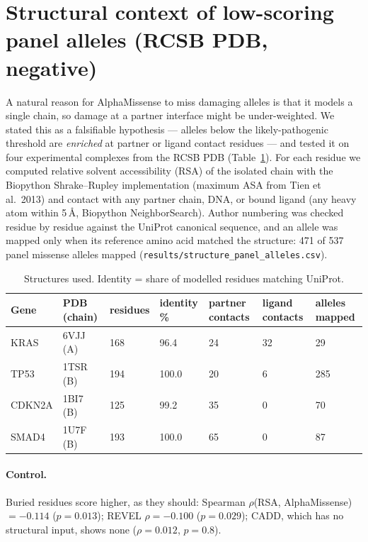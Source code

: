 \section{Structural context of low-scoring panel alleles (RCSB PDB, negative)}
A natural reason for AlphaMissense to miss damaging alleles is that it models
a single chain, so damage at a partner interface might be under-weighted. We
stated this as a falsifiable hypothesis --- alleles below the likely-pathogenic
threshold are \emph{enriched} at partner or ligand contact residues --- and
tested it on four experimental complexes from the RCSB PDB
(Table~\ref{tab:structure}). For each residue we computed relative solvent
accessibility (RSA) of the isolated chain with the Biopython Shrake--Rupley
implementation (maximum ASA from Tien et al.\ 2013) and contact with any
partner chain, DNA, or bound ligand (any heavy atom within 5\,\AA, Biopython
NeighborSearch). Author numbering was checked residue by residue against the
UniProt canonical sequence, and an allele was mapped only when its reference
amino acid matched the structure: 471 of 537 panel missense alleles mapped
(\texttt{results/structure\_panel\_alleles.csv}).

\begin{table}[h]\centering\footnotesize
\caption{Structures used. Identity = share of modelled residues matching UniProt.}\label{tab:structure}
\begin{tabular}{p{1.4cm}p{1.6cm}p{1.2cm}p{1.4cm}p{1.4cm}p{1.4cm}p{1.4cm}}
\hline
Gene & PDB (chain) & residues & identity \% & partner contacts & ligand contacts & alleles mapped \\ \hline
KRAS & 6VJJ (A) & 168 & 96.4 & 24 & 32 & 29 \\
TP53 & 1TSR (B) & 194 & 100.0 & 20 & 6 & 285 \\
CDKN2A & 1BI7 (B) & 125 & 99.2 & 35 & 0 & 70 \\
SMAD4 & 1U7F (B) & 193 & 100.0 & 65 & 0 & 87 \\
\hline\end{tabular}\end{table}

\paragraph{Control.} Buried residues score higher, as they should:
Spearman $\rho$(RSA, AlphaMissense) $=-0.114$ ($p=0.013$); REVEL $\rho=-0.100$
($p=0.029$); CADD, which has no structural input, shows none ($\rho=0.012$,
$p=0.8$).

